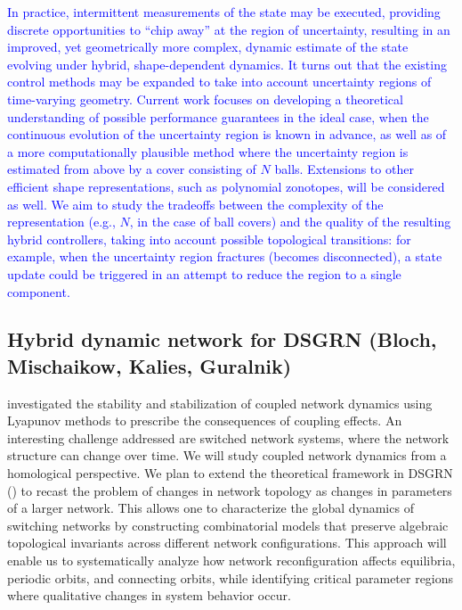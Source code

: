\documentclass[letterpaper,11pt]{article}
\newcommand{\dg}[1]{{\textcolor{blue}{#1}}}
\begin{document}
\dg{
In practice, intermittent measurements of the state may be executed, providing discrete opportunities to ``chip away'' at the region of uncertainty, resulting in an improved, yet geometrically more complex, dynamic estimate of the state evolving under hybrid, shape-dependent dynamics.
%
It turns out that the existing control methods may be expanded to take into account uncertainty regions of time-varying geometry.
%
Current work focuses on developing a theoretical understanding of possible performance guarantees in the ideal case, when the continuous evolution of the uncertainty region is known in advance, as well as of a more computationally plausible method where the uncertainty region is estimated from above by a cover consisting of $N$ balls.
%
Extensions to other efficient shape representations, such as polynomial zonotopes, will be considered as well.
%
We aim to study the tradeoffs between the complexity of the representation (e.g., $N$, in the case of ball covers) and the quality of the resulting hybrid controllers, taking into account possible topological transitions: for example, when the uncertainty region fractures (becomes disconnected), a state update could be triggered in an attempt to reduce the region to a single component.
%
}
\vspace*{0.3cm}

\subsection{Hybrid dynamic network for DSGRN (Bloch, Mischaikow, Kalies, Guralnik)}\label{dynamic networks in DSGRN}
%
\cite{mouyebe2025coupling} investigated the stability and stabilization of coupled network dynamics using Lyapunov methods to prescribe the consequences of coupling effects.
%
An interesting challenge addressed are switched network systems, where the network structure can change over time.
%
We will study coupled network dynamics from a homological perspective.
%
We plan to extend the theoretical framework in DSGRN (\cite{gameiro2024globaldynamicsordinarydifferential}) to recast the problem of changes in network topology as changes in parameters of a larger network.
%
This allows one to characterize the global dynamics of switching networks by constructing combinatorial models that preserve algebraic topological invariants across different network configurations.
%
This approach will enable us to systematically analyze how network reconfiguration affects equilibria, periodic orbits, and connecting orbits, while identifying critical parameter regions where qualitative changes in system behavior occur.
%
\vspace*{0.3cm}
\end{document}
